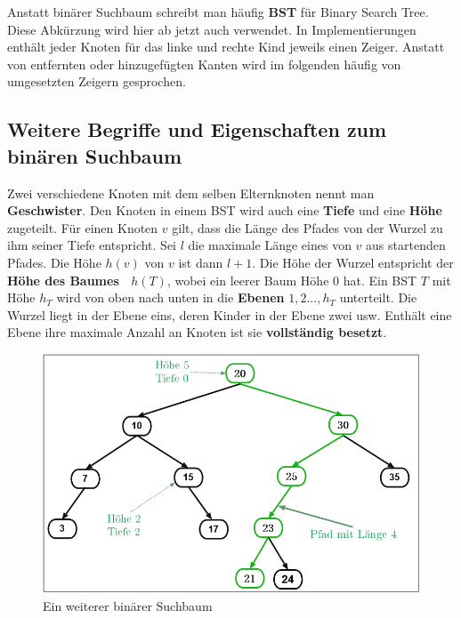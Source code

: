 \documentclass[a4paper,12pt]{article}
\begin{document}
\noindent Anstatt binärer Suchbaum schreibt man häufig \textbf{BST} für Binary Search Tree. Diese Abkürzung wird hier ab jetzt auch verwendet. In Implementierungen enthält jeder Knoten für das linke und rechte Kind jeweils einen Zeiger. Anstatt von entfernten oder hinzugefügten Kanten wird im folgenden häufig von umgesetzten Zeigern gesprochen. 	
\subsection{Weitere Begriffe und Eigenschaften zum binären Suchbaum}	
\noindent Zwei verschiedene Knoten mit dem selben Elternknoten nennt man \textbf{Geschwister}. Den Knoten in einem BST wird auch eine \textbf{Tiefe} und eine \textbf{Höhe} zugeteilt. Für einen Knoten $v$ gilt, dass die Länge des Pfades von der Wurzel zu ihm seiner Tiefe entspricht. Sei $l$ die maximale Länge eines von $v$ aus startenden Pfades. Die Höhe $\mathit{h(v)}$ von $v$ ist dann $l+1$. Die Höhe der Wurzel entspricht der \textbf{Höhe des Baumes~ $h(T)$}, wobei ein leerer Baum Höhe $0$ hat. Ein BST $T$ mit Höhe $h_T$ wird von oben nach unten in die \textbf{Ebenen} $\mathit{1,2...,h_T}$ unterteilt. Die Wurzel liegt in der Ebene eins, deren Kinder in der Ebene zwei usw. Enthält eine Ebene ihre maximale Anzahl an Knoten ist sie \textbf{vollständig besetzt}.
\begin{figure}[h]
	\centering
	\includegraphics[width= 1\textwidth]{"Medien/Einleitung/suchbaum2_2"}
	\caption{Ein weiterer binärer Suchbaum }
	\label{fig:suchbaum2_2}
\end{figure}
\end{document}
